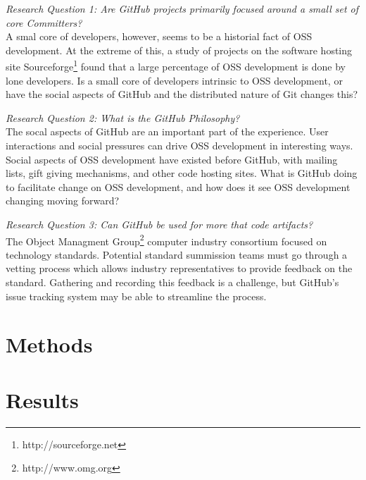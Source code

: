 \documentclass{proc}
\begin{document}
\emph{Research Question 1: Are GitHub projects primarily focused around a small set of core Committers?}\\
A smal core of developers, however, seems to be a historial fact of OSS development\cite{mockus2000case,mockus2000two,krishnamurthy2002cave}. At the extreme of this, a study of projects on the software hosting site Sourceforge\footnote{http://sourceforge.net} found that a large percentage of OSS development is done by lone developers. Is a small core of developers intrinsic to OSS development, or have the social aspects of GitHub and the distributed nature of Git changes this?

\emph{Research Question 2: What is the GitHub Philosophy?}\\
The socal aspects of GitHub are an important part of the experience\cite{dabbish2012social}. User interactions and social pressures can drive OSS development in interesting ways. Social aspects of OSS development have existed before GitHub, with mailing lists\cite{mockus2000case}, gift giving mechanisms\cite{bergquist2008power}, and other code hosting sites. What is GitHub doing to facilitate change on OSS development, and how does it see OSS development changing moving forward?

\emph{Research Question 3: Can GitHub be used for more that code artifacts?}\\
The Object Managment Group\textregistered\footnote{http://www.omg.org} computer industry consortium focused on technology standards. Potential standard summission teams must go through a vetting process\cite{kobryn1999uml} which allows industry representatives to provide feedback on the standard. Gathering and recording this feedback is a challenge, but GitHub's issue tracking system may be able to streamline the process.

\section{Methods}

\section{Results}
\end{document}
